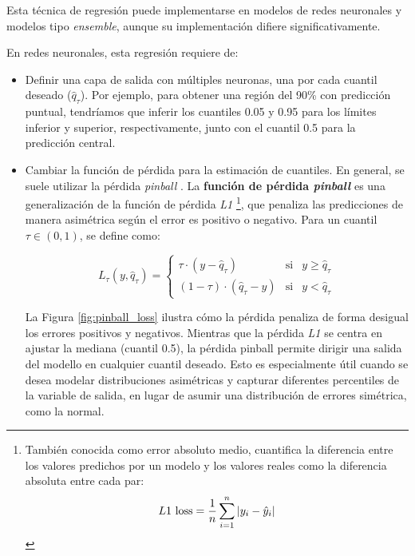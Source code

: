 Esta técnica de regresión puede implementarse en modelos de redes neuronales y modelos tipo \textit{ensemble}, aunque su implementación difiere significativamente. 

En redes neuronales, esta regresión requiere de:

\begin{itemize}

    \item Definir una capa de salida con múltiples neuronas, una por cada cuantil deseado ($\hat{q}_\tau$). 
    Por ejemplo, para obtener una región del 90\% con predicción puntual, tendríamos que inferir los cuantiles 0.05 y 0.95 para los límites inferior y superior, respectivamente, junto con el cuantil 0.5 para la predicción central.

    \item Cambiar la función de pérdida para la estimación de cuantiles. En general, se suele utilizar la pérdida \textit{pinball} \cite{steinwart2011}.
    La \textbf{función de pérdida \textit{pinball}} es una generalización de la función de pérdida 
    \textit{L1}%
    \footnote{
        También conocida como error absoluto medio, cuantifica la diferencia entre los valores predichos por un modelo y los valores reales como la diferencia absoluta entre cada par:
        $$
        L1\textnormal{ loss} = \frac{1}{n} \sum_{i=1}^n |y_i-\hat{y}_i|
        $$
    }, 
    que penaliza las predicciones de manera asimétrica según el error es positivo o negativo. 
    Para un cuantil $\tau \in \left( 0,1\right)$, se define como:

    $$
    L_\tau(y,\hat{q}_\tau) = \left\{
        \begin{array}{rcl}
            \tau \cdot (y-\hat{q}_\tau) & \mbox{si} & y \ge \hat{q}_\tau
            \\
            (1-\tau) \cdot (\hat{q}_\tau-y) & \mbox{si} & y < \hat{q}_\tau
        \end{array}
    \right.
    $$

    La Figura \ref{fig:pinball_loss} ilustra cómo la pérdida penaliza de forma desigual los errores positivos
    y negativos. Mientras que la pérdida \textit{L1} se centra en ajustar la mediana (cuantil 0.5), 
    la pérdida pinball permite dirigir una salida del modello en cualquier cuantil deseado. 
    Esto es especialmente útil cuando se desea modelar distribuciones asimétricas y capturar diferentes 
    percentiles de la variable de salida, en lugar de asumir una distribución de errores simétrica, como la 
    normal.
    

\end{itemize}
